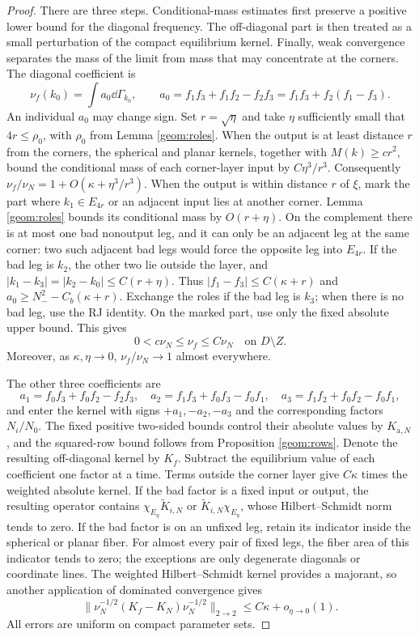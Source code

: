 \begin{proof}
There are three steps. Conditional-mass estimates first preserve a
positive lower bound for the diagonal frequency. The off-diagonal part
is then treated as a small perturbation of the compact equilibrium kernel.
Finally, weak convergence separates the mass of the limit from mass
that may concentrate at the corners.
The diagonal coefficient is
\[
 \nu_f(k_0)=\int a_0\dd\Gamma_{k_0},\qquad
 a_0=f_1f_3+f_1f_2-f_2f_3=f_1f_3+f_2(f_1-f_3).
\]
An individual $a_0$ may change sign. Set $r=\sqrt\eta$ and take $\eta$
sufficiently small that $4r\le\rho_0$, with $\rho_0$ from
Lemma \ref{geom:roles}.
When the output is at least distance $r$ from the corners, the spherical
and planar kernels, together with $M(k)\ge cr^2$, bound the conditional
mass of each corner-layer input by $C\eta^3/r^3$. Consequently
$\nu_f/\nu_N=1+O(\kappa+\eta^3/r^3)$.
When the output is within distance $r$ of $\xi$, mark the part where
$k_1\in E_{4r}$ or an adjacent input lies at another corner.
Lemma \ref{geom:roles} bounds its conditional mass by $O(r+\eta)$.
On the complement there is at most one bad nonoutput leg, and it can
only be an adjacent leg at the same corner: two such adjacent bad legs
would force the opposite leg into $E_{4r}$.
If the bad leg is $k_2$, the other two lie outside the layer, and
$|k_1-k_3|=|k_2-k_0|\le C(r+\eta)$. Thus
$|f_1-f_3|\le C(\kappa+r)$ and
$a_0\ge N_-^2-C_b(\kappa+r)$.
Exchange the roles if the bad leg is $k_3$; when there is no bad leg,
use the RJ identity. On the marked part, use only the fixed absolute
upper bound. This gives
\begin{equation}\label{geom:fulldiagonal}
 0<c\nu_N\le\nu_f\le C\nu_N
 \quad\text{on }D\setminus Z.
\end{equation}
Moreover, as $\kappa,\eta\to0$, $\nu_f/\nu_N\to1$ almost everywhere.

The other three coefficients are
\[
 a_1=f_0f_3+f_0f_2-f_2f_3,\quad
 a_2=f_1f_3+f_0f_3-f_0f_1,\quad
 a_3=f_1f_2+f_0f_2-f_0f_1,
\]
and enter the kernel with signs $+a_1,-a_2,-a_3$ and the corresponding
factors $N_i/N_0$.
The fixed positive two-sided bounds control their absolute values by
$K_{\mathrm a,N}$, and the squared-row bound follows from
Proposition \ref{geom:rows}.
Denote the resulting off-diagonal kernel by $K_f$.
Subtract the equilibrium value of each coefficient one factor at a time.
Terms outside the corner layer give $C\kappa$ times the weighted absolute
kernel. If the bad factor is a fixed input or output, the resulting
operator contains $\chi_{E_\eta}\widetilde K_{i,N}$ or
$\widetilde K_{i,N}\chi_{E_\eta}$, whose Hilbert--Schmidt norm tends to zero.
If the bad factor is on an unfixed leg, retain its indicator inside the
spherical or planar fiber. For almost every pair of fixed legs, the
fiber area of this indicator tends to zero; the exceptions are only
degenerate diagonals or coordinate lines.
The weighted Hilbert--Schmidt kernel provides a majorant, so another
application of dominated convergence gives
\[
 \|\nu_N^{-1/2}(K_f-K_N)\nu_N^{-1/2}\|_{2\to2}
                  \le C\kappa+o_{\eta\to0}(1).
\]
All errors are uniform on compact parameter sets.


\end{proof}
